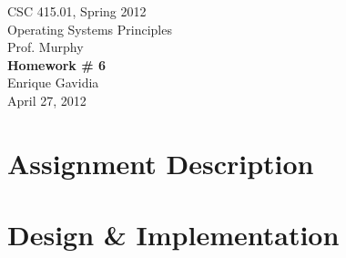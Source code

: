 \documentclass[12pt]{article}
\def \name       {Enrique Gavidia}
\def \coursenum  {CSC 415.01}
\def \coursename {Operating Systems Principles}
\def \instructor {Prof. Murphy}
\def \semester   {Spring 2012}
\def \assignment {Homework \# 6}
\def \duedate    {April 27, 2012}
\newcommand {\makecover} {
  \begin{titlepage}
    \begin{center}
      \LARGE{\coursenum, \semester \\ \coursename}\\
      \Large{\instructor}\\
      \vfill
      \textbf{\Huge \assignment}\\
      \vfill
      \Large{\name}\\
      \large{\duedate}
    \end{center}
  \end{titlepage}
}
\begin{document}
\makecover

\section*{Assignment Description}


% 
% 


\section*{Design \& Implementation}


% 
\end{document}
